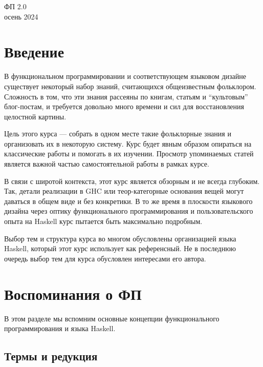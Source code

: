 \documentclass[12pt]{article}
\begin{document}
    \begin{center}
    {\LARGE ФП 2.0}
        \\
        осень 2024
    \end{center}

    \tableofcontents

    \newpage

    \section*{Введение}

    В функциональном программировании и соответствующем языковом дизайне существует некоторый набор знаний, считающихся общеизвестным фольклором.
    Сложность в том, что эти знания рассеяны по книгам, статьям и ``культовым'' блог-постам, и требуется довольно много времени и сил для восстановления целостной картины.

    Цель этого курса --- собрать в одном месте такие фольклорные знания и организовать их в некоторую систему.
    Курс будет явным образом опираться на классические работы и помогать в их изучении.
    Просмотр упоминаемых статей является важной частью самостоятельной работы в рамках курсе.

    В связи с широтой контекста, этот курс является обзорным и не всегда глубоким.
    Так, детали реализации в GHC или теор-категорные основания вещей могут даваться в общем виде и без конкретики.
    В то же время в плоскости языкового дизайна через оптику функционального программирования и пользовательского опыта на Haskell курс пытается быть максимально подробным.

    Выбор тем и структура курса во многом обусловлены организацией языка Haskell, который этот курс использует как референсный.
    Не в последнюю очередь выбор тем для курса обусловлен интересами его автора.


    \clearpage


    \section{Воспоминания о ФП}

    В этом разделе мы вспомним основные концепции функционального программирования и языка Haskell.

    \subsection{Термы и редукция} \label{subsec:terms-reduction}
\end{document}
